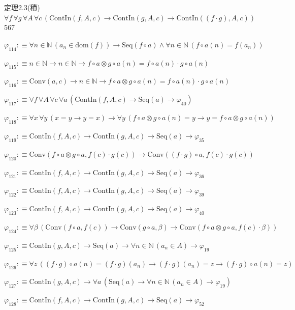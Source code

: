 \begin{fullproof}{定理2.3(積)}{$\forall f\,\forall g\,\forall A\,\forall c\,(\mathrm{ContIn}(f,A,c) \to \mathrm{ContIn}(g,A,c) \to \mathrm{ContIn}((f \cdot g),A,c))$}{567}
\begin{abbrevlist}
\item $\varphi_{114} :\equiv \forall n \in \mathbb{N}\,(a_{n} \in \mathrm{dom}(f)) \to \mathrm{Seq}(f \circ a) \land \forall n \in \mathbb{N}\,(f \circ a(n) = f(a_{n}))$
\item $\varphi_{115} :\equiv n \in \mathbb{N} \to n \in \mathbb{N} \to f \circ a \otimes g \circ a(n) = f \circ a(n) \cdot g \circ a(n)$
\item $\varphi_{116} :\equiv \mathrm{Conv}(a,c) \to n \in \mathbb{N} \to f \circ a \otimes g \circ a(n) = f \circ a(n) \cdot g \circ a(n)$
\item $\varphi_{117} :\equiv \forall f\,\forall A\,\forall c\,\forall a\,(\mathrm{ContIn}(f,A,c) \to \mathrm{Seq}(a) \to \varphi_{40})$
\item $\varphi_{118} :\equiv \forall x\,\forall y\,(x = y \to y = x) \to \forall y\,(f \circ a \otimes g \circ a(n) = y \to y = f \circ a \otimes g \circ a(n))$
\item $\varphi_{119} :\equiv \mathrm{ContIn}(f,A,c) \to \mathrm{ContIn}(g,A,c) \to \mathrm{Seq}(a) \to \varphi_{35}$
\item $\varphi_{120} :\equiv \mathrm{Conv}(f \circ a \otimes g \circ a,f(c) \cdot g(c)) \to \mathrm{Conv}((f \cdot g) \circ a,f(c) \cdot g(c))$
\item $\varphi_{121} :\equiv \mathrm{ContIn}(f,A,c) \to \mathrm{ContIn}(g,A,c) \to \mathrm{Seq}(a) \to \varphi_{36}$
\item $\varphi_{122} :\equiv \mathrm{ContIn}(f,A,c) \to \mathrm{ContIn}(g,A,c) \to \mathrm{Seq}(a) \to \varphi_{39}$
\item $\varphi_{123} :\equiv \mathrm{ContIn}(f,A,c) \to \mathrm{ContIn}(g,A,c) \to \mathrm{Seq}(a) \to \varphi_{40}$
\item $\varphi_{124} :\equiv \forall \beta\,(\mathrm{Conv}(f \circ a,f(c)) \to \mathrm{Conv}(g \circ a,\beta) \to \mathrm{Conv}(f \circ a \otimes g \circ a,f(c) \cdot \beta))$
\item $\varphi_{125} :\equiv \mathrm{ContIn}(g,A,c) \to \mathrm{Seq}(a) \to \forall n \in \mathbb{N}\,(a_{n} \in A) \to \varphi_{19}$
\item $\varphi_{126} :\equiv \forall z\,((f \cdot g) \circ a(n) = (f \cdot g)(a_{n}) \to (f \cdot g)(a_{n}) = z \to (f \cdot g) \circ a(n) = z)$
\item $\varphi_{127} :\equiv \mathrm{ContIn}(g,A,c) \to \forall a\,(\mathrm{Seq}(a) \to \forall n \in \mathbb{N}\,(a_{n} \in A) \to \varphi_{19})$
\item $\varphi_{128} :\equiv \mathrm{ContIn}(f,A,c) \to \mathrm{ContIn}(g,A,c) \to \mathrm{Seq}(a) \to \varphi_{52}$

\end{abbrevlist}
\end{fullproof}
